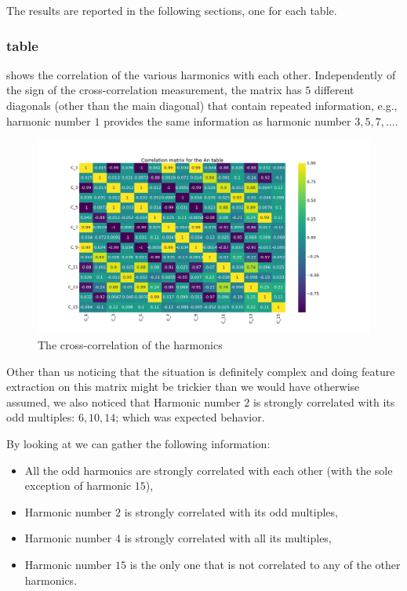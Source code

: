 The results are reported in the following sections, one for each table.

\subsubsection{\an table}
 shows the correlation of the various harmonics with each other. Independently
of the sign of the cross-correlation measurement, the matrix has $5$ different diagonals (other than
the main diagonal) that contain repeated information, e.g., harmonic number $1$ provides the same
information as harmonic number $3, 5, 7, \ldots$.
\begin{figure}
	\centering
	\includegraphics[width=\linewidth]{img/An_corr_matrix.png}
	\caption{The cross-correlation of the \an harmonics} \label{fig:an-corr}
\end{figure}
Other than us noticing that the situation is definitely complex and doing feature extraction on this
matrix might be trickier than we would have otherwise assumed, we also noticed that Harmonic number
$2$ is strongly correlated with its odd multiples: $6, 10, 14$; which was expected behavior.

By looking at  we can gather the following information:
\begin{itemize}
	\item All the odd harmonics are strongly correlated with each other (with the sole exception
	      of harmonic $15$),
	\item Harmonic number $2$ is strongly correlated with its odd multiples,
	\item Harmonic number $4$ is strongly correlated with all its multiples,
	\item Harmonic number $15$ is the only one that is not correlated to any of the other
	      harmonics.
\end{itemize}

